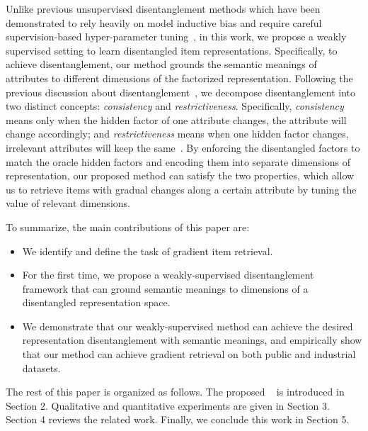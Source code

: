 Unlike previous unsupervised disentanglement methods which have been demonstrated to rely heavily on model inductive bias and require careful supervision-based hyper-parameter tuning~\cite{Locatello19challengedisentangle}, in this work, we propose a weakly supervised setting to learn disentangled item representations. Specifically, to achieve disentanglement, our method grounds the semantic meanings of attributes to different dimensions of the factorized representation. Following the previous discussion about disentanglement~\cite{shu20disentangleguarantee}, we decompose disentanglement into two distinct concepts: \textit{consistency} and \textit{restrictiveness}. Specifically, \textit{consistency} means only when the hidden factor of one attribute changes, the attribute will change accordingly; and \textit{restrictiveness} means when one hidden factor changes, irrelevant attributes will keep the same~\cite{shu20disentangleguarantee}. By enforcing the disentangled factors to match the oracle hidden factors and encoding them into separate dimensions of representation, our proposed method can satisfy the two properties, which allow us to retrieve items with gradual changes along a certain attribute by tuning the value of relevant dimensions. 


To summarize, the main contributions of this paper are:
\begin{itemize}[leftmargin=15pt]
    \item We identify and define the task of gradient item retrieval.
    \item For the first time, we propose a weakly-supervised disentanglement framework that can ground semantic meanings to dimensions of a disentangled representation space.
    \item We demonstrate that our weakly-supervised method can achieve the desired representation disentanglement with semantic meanings, and
    empirically show that our method can achieve gradient retrieval on both public and industrial datasets.
\end{itemize}


The rest of this paper is organized as follows. The proposed \CGIR~ is introduced in Section 2. Qualitative and quantitative experiments are given in Section 3. Section 4 reviews the related work.  Finally, we conclude this work in Section 5.